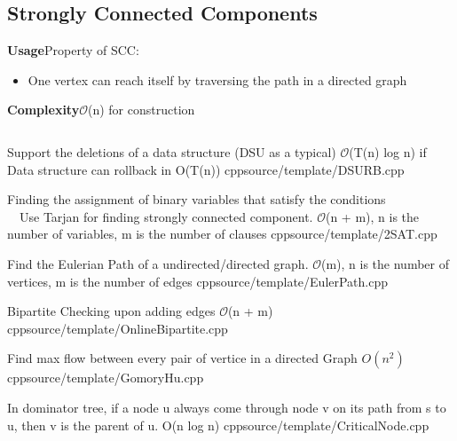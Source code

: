 \subsection{Strongly Connected Components}
\textbf{Usage}Property of SCC:
  \begin{itemize}
    \item One vertex can reach itself by traversing the path in a directed graph
  \end{itemize}
\textbf{Complexity}$\mathcal{O}$(n) for construction
\inputminted[]{cpp}{source/template/SCC.cpp}


{Support the deletions of a data structure (DSU as a typical) }
{$\mathcal{O}$(T(n) log n) if Data structure can rollback in O(T(n))}
{cpp}{source/template/DSURB.cpp}


{Finding the assignment of binary variables that satisfy the conditions \\
 \ \ Use Tarjan for finding strongly connected component.
}
{$\mathcal{O}$(n + m), n is the number of variables, m is the number of clauses}
{cpp}{source/template/2SAT.cpp}


{Find the Eulerian Path of a undirected/directed graph. }
{$\mathcal{O}$(m), n is the number of vertices, m is the number of edges}
{cpp}{source/template/EulerPath.cpp}

{Bipartite Checking upon adding edges}
{$\mathcal{O}$(n + m)}
{cpp}{source/template/OnlineBipartite.cpp}

{Find max flow between every pair of vertice in a directed Graph}
{$O(n^2)$}
{cpp}{source/template/GomoryHu.cpp}


{In dominator tree, if a node u always come through node v on its path from s to u, then v is the parent of u.}
{O(n log n)}
{cpp}{source/template/CriticalNode.cpp}
